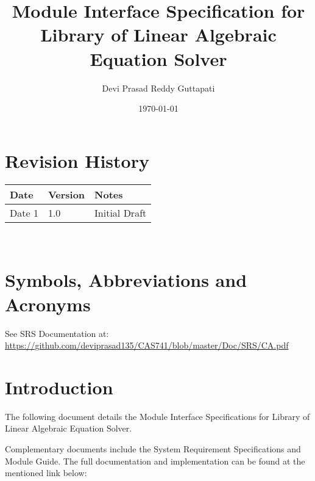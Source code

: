 \documentclass[12pt, titlepage]{article}
\begin{document}
\title{Module Interface Specification for Library of Linear Algebraic Equation Solver}

\author{Devi Prasad Reddy Guttapati}

\date{\today}

\maketitle


\section{Revision History}


\begin{tabularx}{\textwidth}{p{3cm}p{2cm}X}
\toprule {\bf Date} & {\bf Version} & {\bf Notes}\\
\midrule
Date 1 & 1.0 & Initial Draft\\

\bottomrule
\end{tabularx}

~\newpage

\section{Symbols, Abbreviations and Acronyms}

See SRS Documentation at:  \url{https://github.com/deviprasad135/CAS741/blob/master/Doc/SRS/CA.pdf}


\newpage

\tableofcontents

\newpage


\section{Introduction}

The following document details the Module Interface Specifications for Library
of Linear Algebraic Equation Solver.  

Complementary documents include the System Requirement Specifications
and Module Guide.  The full documentation and implementation can be
found at the mentioned link below:
\end{document}
